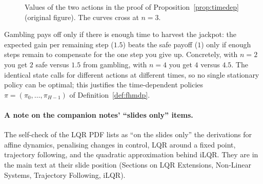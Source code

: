 \documentclass[11pt,a4paper]{article}
\theoremstyle{plain}
\theoremstyle{definition}
\theoremstyle{remark}
\begin{document}
\begin{figure}[H]
\centering
{}
\caption{Values of the two actions in the proof of Proposition~\ref{prop:timedep} (original figure). The curves cross at $n=3$.}
\end{figure}

\begin{intuition}
Gambling pays off only if there is enough time to harvest the jackpot: the expected gain per remaining step ($1.5$) beats the safe payoff ($1$) only if enough steps remain to compensate for the one step you give up. Concretely, with $n=2$ you get $2$ safe versus $1.5$ from gambling, with $n=4$ you get $4$ versus $4.5$. The identical state calls for different actions at different times, so no single stationary policy can be optimal; this justifies the time-dependent policies $\pi=(\pi_0,\dots,\pi_{H-1})$ of Definition~\ref{def:fhmdp}.
\end{intuition}

\paragraph{A note on the companion notes' ``slides only'' items.} The self-check of the LQR PDF lists as ``on the slides only'' the derivations for affine dynamics, penalising changes in control, LQR around a fixed point, trajectory following, and the quadratic approximation behind iLQR. They are in the main text at their slide position (Sections on LQR Extensions, Non-Linear Systems, Trajectory Following, iLQR).
\end{document}
